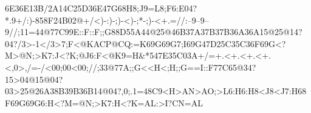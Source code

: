 6E36E13B/2A14C25D36E47G68H8;J9=L8;F6:E04?*.9+/:)-858F24B02@+/<)-:)-;)-<)-;*-;)-<+.=//:--9--9--9//;11=44@77C99E::F::F;;G88D55A44@25@46B37A37B37B36A36A15@25@14?04?/3>-1</3>7;F<@KACP@CQ:=K69G69G7;I69G47D25C35C36F69G<?M>@N;>K7:J<?K;@J6:F<@K9=H&*547E35C03A+/=+.<+.<+.<+.<,0>,/=-/<00;00<00;//;33@77A;;G<<H<;H;;G==I::F77C65@34?15>04@15@04?03>25@26A38B39B36B14@04?,0;.1=48C9<H>AN>AO;>L6:H6:H8<J8<J7:H68F69G69G6:H<?M=@N;>K7:H<?K=AL:>I?CN=AL%
